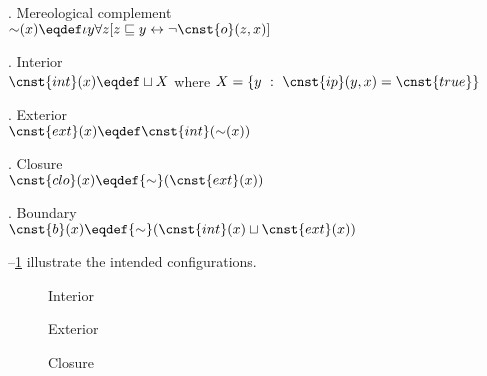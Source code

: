 \ex. Mereological complement\label{ex:mereological-complement} \citep[p. 45; adapted]{casati_varzi1999parts}\\
${\sim}(x) \eqdef \iota y\forall z[z \sqsubseteq y \leftrightarrow \neg\cnst{o}(z,x)]$

\ex. Interior\label{ex:interior} \citep[p. 58; adapted]{casati_varzi1999parts}\\
$\cnst{int}(x) \eqdef \sqcup X$ where $X = \{y\ :\ \cnst{ip}(y,x) = \cnst{true}\}$

\ex. Exterior\label{ex:exterior} \citep[p. 58; adapted]{casati_varzi1999parts}\\
$\cnst{ext}(x) \eqdef \cnst{int}({ \sim} (x))$

\ex. Closure\label{ex:closure} \citep[p. 58; adapted]{casati_varzi1999parts}\\
$\cnst{clo}(x) \eqdef { \sim}(\cnst{ext}(x))$

\ex. Boundary\label{ex:boundary} \citep[p. 58; adapted]{casati_varzi1999parts}\\
$\cnst{b}(x) \eqdef { \sim}(\cnst{int}(x) \sqcup \cnst{ext}(x))$

--\ref{fig:closure} illustrate the intended configurations.

\begin{figure}
\begin{floatrow}
  \captionsetup{margin=.05\linewidth}
  {\caption{Interior\label{fig:interior}}}
   {\caption{Exterior\label{fig:exterior}}}
  {\caption{Closure\label{fig:closure}}}
\end{floatrow}
\end{figure}

